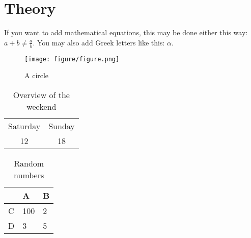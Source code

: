 
\section{Theory}

If you want to add mathematical equations, this may be done either this way: $a +  b \neq \frac{a}{b}$. You may also add Greek letters like this: $\alpha$.\\ 

\blindtext %

\begin{figure}[htpb!] %
    \centering %
\texttt{[image: figure/figure.png]} %
    \caption{A circle} %
    \label{fig:my_label} %
\end{figure}

\blindtext %

\begin{table}[] %
    \centering
    \begin{tabular}{c|c}
        Saturday & Sunday \\
        12 & 18
    \end{tabular}
    \caption{Overview of the weekend}%
    \label{tab:weekend} %
\end{table}

\begin{table}[] %
    \centering
\begin{tabular}{@{}lll@{}}
\toprule
  & A   & B \\ \midrule
C & 100 & 2 \\
D & 3   & 5 \\ \bottomrule
\end{tabular}
    \caption{Random numbers} %
    \label{tab:numbers} %
\end{table}

